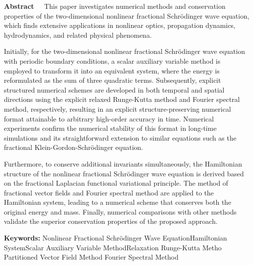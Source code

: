 \begin{EnglishAbstract}
\item {\bf Abstract\ \ } 
This paper investigates numerical methods and conservation properties of the two-dimensional nonlinear fractional Schr{\"o}dinger wave equation, which finds extensive applications in nonlinear optics, propagation dynamics, hydrodynamics, and related physical phenomena.

Initially, for the two-dimensional nonlinear fractional Schr{\"o}dinger wave equation with periodic boundary conditions, a scalar auxiliary variable method is employed to transform it into an equivalent system, where the energy is reformulated as the sum of three quadratic terms. 
Subsequently, explicit structured numerical schemes are developed in both temporal and spatial directions using the explicit relaxed Runge-Kutta method and Fourier spectral method, respectively, resulting in an explicit structure-preserving numerical format attainable to arbitrary high-order accuracy in time. 
Numerical experiments confirm the numerical stability of this format in long-time simulations and its straightforward extension to similar equations such as the fractional Klein-Gordon-Schr{\"o}dinger equation.

Furthermore, to conserve additional invariants simultaneously, the Hamiltonian structure of the nonlinear fractional Schr{\"o}dinger wave equation is derived based on the fractional Laplacian functional variational principle. The method of fractional vector fields and Fourier spectral method are applied to the Hamiltonian system, 
leading to a numerical scheme that conserves both the original energy and mass. Finally, numerical comparisons with other methods validate the superior conservation properties of the proposed approach.
\item {\bf Keywords:} Nonlinear Fractional Schr{\"o}dinger Wave Equation\qquad Hamiltonian System\qquad Scalar Auxiliary Variable Method\qquad Relaxation Runge-Kutta Metho \qquad Partitioned Vector Field Method \qquad Fourier Spectral Method
\end{EnglishAbstract}
